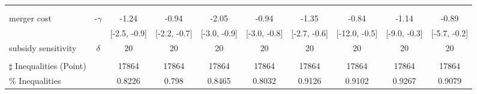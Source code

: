 \begin{tabular}{@{\extracolsep{5pt}}lccccccccc}
 &  &  &  &  &  &  &  &  &  \\
 &  &  &  &  &  &  &  &  &  \\
merger cost & -$\gamma$ & -1.24 & -0.94 & -2.05 & -0.94 & -1.35 & -0.84 & -1.14 & -0.89 \\
 &  & [-2.5, -0.9] & [-2.2, -0.7] & [-3.0, -0.9] & [-3.0, -0.8] & [-2.7, -0.6] & [-12.0, -0.5] & [-9.0, -0.3] & [-5.7, -0.2] \\
subsidy sensitivity & $\delta$ & 20 & 20 & 20 & 20 & 20 & 20 & 20 & 20 \\
 &  &  &  &  &  &  &  &  &  \\
\hline 
$\sharp$ Inequalities (Point) &  & 17864 & 17864 & 17864 & 17864 & 17864 & 17864 & 17864 & 17864 \\
\% Inequalities &  & 0.8226 & 0.798 & 0.8465 & 0.8032 & 0.9126 & 0.9102 & 0.9267 & 0.9079 \\
\bottomrule 
\end{tabular}
